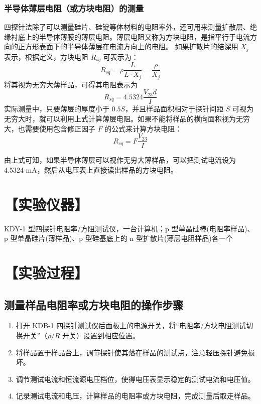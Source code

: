 \documentclass[a4paper,utf8]{article}
\begin{document}
        \subsubsection{半导体薄层电阻（或方块电阻）的测量}
        四探针法除了可以测量硅片、硅锭等体材料的电阻率外，还可用来测量扩散层、绝缘衬底上的半导体薄膜的薄层电阻。薄层电阻又称为方块电阻，是指平行于电流方向的正方形表面下的半导体薄层在电流方向上的电阻。
        如果扩散片的结深用 $X_j$ 表示，根据定义，方块电阻 $R_{sq}$ 可表示为：
            \begin{equation*}
                R_{sq}=\rho\frac{L}{L\cdot X_{j}}=\frac{\rho}{X_{j}} \label{eq:2}
            \end{equation*}
            将其视为无穷大薄样品，可得其电阻表示为
            \begin{equation*}
                R_{sq}=4.5324\frac{V_{23} d}{I} \label{eq:3}
            \end{equation*}
            实际测量中，只要薄层的厚度小于 $0.5S$，并且样品面积相对于探针间距 $S$ 可视为无穷大时，就可以利用上式计算薄层电阻。如果不能将样品的横向面积视为无穷大，也需要使用包含修正因子 $F$ 的公式来计算方块电阻：
            \begin{equation*}
                R_{sq}= F \frac{V_{23}}{I} \label{eq:4}
            \end{equation*}

            由上式可知，如果半导体薄层可以视作无穷大薄样品，可以把测试电流设为 4.5324 mA，然后从电压表上直接读出样品的方块电阻。
        
\section*{【实验仪器】}%
    KDY-1 型四探针电阻率/方阻测试仪，一台计算机；p 型单晶硅棒(电阻率样品)、p 型单晶硅片(薄样品)、p 型硅基底上的 n 型扩散片(薄层电阻样品)各一个
    \section*{【实验过程】}
    \subsection*{测量样品电阻率或方块电阻的操作步骤}
    \begin{enumerate}
        \item 打开 KDB-1 四探针测试仪后面板上的电源开关，将“电阻率/方块电阻测试切换开关”（$\rho/R$ 开关）设置到相应位置。
        \item 将样品置于样品台上，调节探针使其落在样品的测试点，注意轻压探针避免损坏。
        \item 调节测试电流和恒流源电压档位，使得电压表显示稳定的测试电流和电压值。
        \item 记录测试电流和电压，计算样品的电阻率或方块电阻，完成测量后取走样品。
    \end{enumerate}
    
\end{document}

